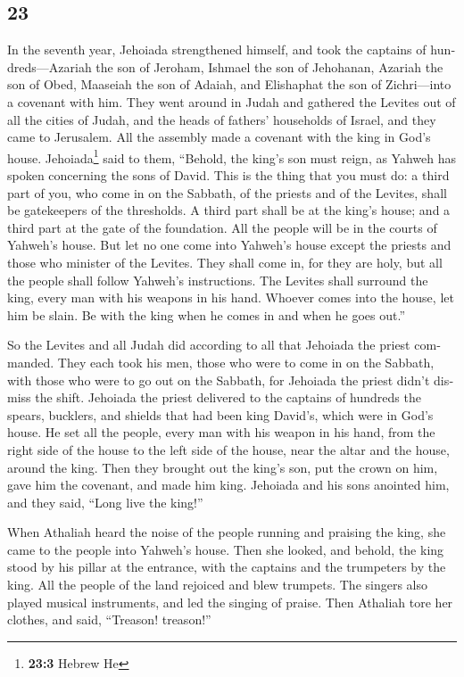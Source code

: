 \begin{paracol}{2}
\begin{otherlanguage}{english}
\hypertarget{section-45}{%
\section{23}\label{section-45}}

 In the seventh year, Jehoiada strengthened himself, and
took the captains of hundreds---Azariah the son of Jeroham, Ishmael the
son of Jehohanan, Azariah the son of Obed, Maaseiah the son of Adaiah,
and Elishaphat the son of Zichri---into a covenant with him.
 They went around in Judah and gathered the Levites out of
all the cities of Judah, and the heads of fathers' households of Israel,
and they came to Jerusalem.  All the assembly made a
covenant with the king in God's house. Jehoiada\footnote{\textbf{23:3}
  Hebrew He} said to them, ``Behold, the king's son must reign, as
Yahweh has spoken concerning the sons of David.  This is
the thing that you must do: a third part of you, who come in on the
Sabbath, of the priests and of the Levites, shall be gatekeepers of the
thresholds.  A third part shall be at the king's house;
and a third part at the gate of the foundation. All the people will be
in the courts of Yahweh's house.  But let no one come into
Yahweh's house except the priests and those who minister of the Levites.
They shall come in, for they are holy, but all the people shall follow
Yahweh's instructions.  The Levites shall surround the
king, every man with his weapons in his hand. Whoever comes into the
house, let him be slain. Be with the king when he comes in and when he
goes out.''

 So the Levites and all Judah did according to all that
Jehoiada the priest commanded. They each took his men, those who were to
come in on the Sabbath, with those who were to go out on the Sabbath,
for Jehoiada the priest didn't dismiss the shift. 
Jehoiada the priest delivered to the captains of hundreds the spears,
bucklers, and shields that had been king David's, which were in God's
house.  He set all the people, every man with his weapon
in his hand, from the right side of the house to the left side of the
house, near the altar and the house, around the king. 
Then they brought out the king's son, put the crown on him, gave him the
covenant, and made him king. Jehoiada and his sons anointed him, and
they said, ``Long live the king!''

 When Athaliah heard the noise of the people running and
praising the king, she came to the people into Yahweh's house.
 Then she looked, and behold, the king stood by his
pillar at the entrance, with the captains and the trumpeters by the
king. All the people of the land rejoiced and blew trumpets. The singers
also played musical instruments, and led the singing of praise. Then
Athaliah tore her clothes, and said, ``Treason! treason!''


\end{otherlanguage}
\end{paracol}
